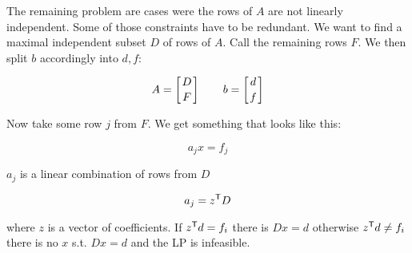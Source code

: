 The remaining problem are cases were the rows of $A$ are not linearly independent. Some of those constraints have to be redundant. We want to find a maximal independent subset $D$ of rows of $A$. Call the remaining rows $F$. We then split $b$ accordingly into $d,f$:

\[A=\left[ D \atop F\right] \qquad b = \left[d\atop f\right]\]

Now take some row $j$ from $F$. We get something that looks like this:

\[a_jx=f_j\]

$a_j$ is a linear combination of rows from $D$

\[a_j={z}^\text{\upshape \sffamily T} D\]

where $z$ is a vector of coefficients. If ${z}^\text{\upshape \sffamily T} d = f_i$ there is $Dx=d$ otherwise ${z}^\text{\upshape \sffamily T} d \neq f_i$ there is no $x$ s.t. $Dx=d$ and the LP is infeasible.